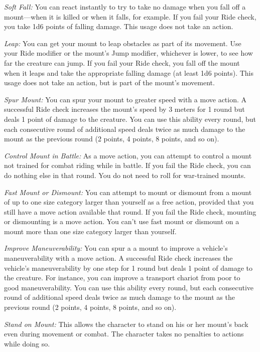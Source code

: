 \textit{Soft Fall:} You can react instantly to try to take no damage when you fall off a mount---when it is killed or when it falls, for example. If you fail your Ride check, you take 1d6 points of falling damage. This usage does not take an action.

\textit{Leap:} You can get your mount to leap obstacles as part of its movement. Use your Ride modifier or the mount's Jump modifier, whichever is lower, to see how far the creature can jump. If you fail your Ride check, you fall off the mount when it leaps and take the appropriate falling damage (at least 1d6 points). This usage does not take an action, but is part of the mount's movement.

\textit{Spur Mount:} You can spur your mount to greater speed with a move action. A successful Ride check increases the mount's speed by 3 meters for 1 round but deals 1 point of damage to the creature. You can use this ability every round, but each consecutive round of additional speed deals twice as much damage to the mount as the previous round (2 points, 4 points, 8 points, and so on).

\textit{Control Mount in Battle:} As a move action, you can attempt to control a mount not trained for combat riding while in battle. If you fail the Ride check, you can do nothing else in that round. You do not need to roll for war-trained mounts.

\textit{Fast Mount or Dismount:} You can attempt to mount or dismount from a mount of up to one size category larger than yourself as a free action, provided that you still have a move action available that round. If you fail the Ride check, mounting or dismounting is a move action. You can't use fast mount or dismount on a mount more than one size category larger than yourself.

\textit{Improve Maneuverability:} You can spur a a mount to improve a vehicle's maneuverability with a move action. A successful Ride check increases the vehicle's maneuverability by one step for 1 round but deals 1 point of damage to the creature. For instance, you can improve a transport chariot from poor to good maneuverability. You can use this ability every round, but each consecutive round of additional speed deals twice as much damage to the mount as the previous round (2 points, 4 points, 8 points, and so on).

\textit{Stand on Mount:} This allows the character to stand on his or her mount's back even during movement or combat. The character takes no penalties to actions while doing so.

